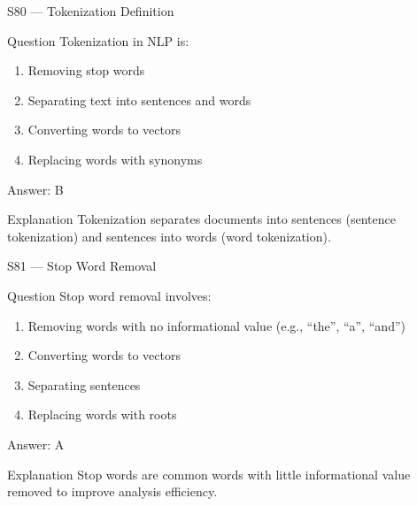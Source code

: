 \documentclass[aspectratio=169,8pt]{beamer}
\begin{document}
	\begin{frame}{S80 --- Tokenization Definition}
		\begin{block}{Question}
			Tokenization in NLP is:
			\begin{enumerate}
				\item Removing stop words
				\item Separating text into sentences and words
				\item Converting words to vectors
				\item Replacing words with synonyms
			\end{enumerate}
		\end{block}
		\begin{exampleblock}{Answer: B}\end{exampleblock}
		\begin{block}{Explanation}
			Tokenization separates documents into sentences (sentence tokenization) and sentences into words (word tokenization).
		\end{block}
	\end{frame}
	
	\begin{frame}{S81 --- Stop Word Removal}
		\begin{block}{Question}
			Stop word removal involves:
			\begin{enumerate}
				\item Removing words with no informational value (e.g., ``the'', ``a'', ``and'')
				\item Converting words to vectors
				\item Separating sentences
				\item Replacing words with roots
			\end{enumerate}
		\end{block}
		\begin{exampleblock}{Answer: A}\end{exampleblock}
		\begin{block}{Explanation}
			Stop words are common words with little informational value removed to improve analysis efficiency.
		\end{block}
	\end{frame}
	
\end{document}
